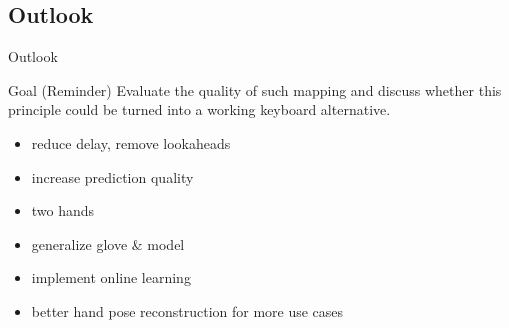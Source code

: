 
\subsection{Outlook}
\begin{frame}{Outlook}
    \begin{block}{Goal (Reminder)}
        Evaluate the quality of such mapping and discuss whether this principle
        could be turned into a working keyboard alternative.
    \end{block}
    \pause
    \vfill\null
    \begin{itemize}
        \item reduce delay, remove lookaheads
        \item increase prediction quality
        \item two hands
        \item generalize glove \& model
        \item implement online learning
        \item better hand pose reconstruction for more use cases
    \end{itemize}
\end{frame}

